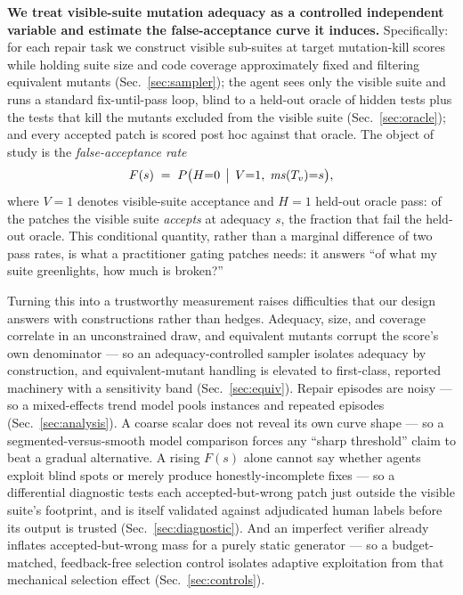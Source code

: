 \documentclass[conference]{IEEEtran}
\newcommand{\ms}{\ensuremath{\mathit{ms}}}
\newcommand{\Fs}{\ensuremath{F(s)}}
\begin{document}
\textbf{We treat visible-suite mutation adequacy as a controlled
independent variable and estimate the false-acceptance curve it induces.}
Specifically: for each repair task we construct visible sub-suites at
target mutation-kill scores while holding suite size and code coverage
approximately fixed and filtering equivalent mutants
(Sec.~\ref{sec:sampler}); the agent sees only the visible suite and runs a
standard fix-until-pass loop, blind to a held-out oracle of hidden tests
plus the tests that kill the mutants excluded from the visible suite
(Sec.~\ref{sec:oracle}); and every accepted patch is scored post hoc
against that oracle. The object of study is the \emph{false-acceptance
rate}
\begin{equation}
\Fs \;=\; P\bigl(H{=}0 \,\bigm|\, V{=}1,\; \ms(T_v){=}s\bigr),
\label{eq:fs}
\end{equation}
where $V{=}1$ denotes visible-suite acceptance and $H{=}1$ held-out oracle
pass: of the patches the visible suite \emph{accepts} at adequacy $s$, the
fraction that fail the held-out oracle. This conditional quantity, rather
than a marginal difference of two pass rates, is what a practitioner
gating patches needs: it answers ``of what my suite greenlights, how much
is broken?''

Turning this into a trustworthy measurement raises difficulties that our
design answers with constructions rather than hedges. Adequacy, size, and
coverage correlate in an unconstrained draw, and equivalent mutants
corrupt the score's own denominator --- so an adequacy-controlled sampler
isolates adequacy by construction, and equivalent-mutant handling is
elevated to first-class, reported machinery with a sensitivity band
(Sec.~\ref{sec:equiv}). Repair episodes are noisy --- so a mixed-effects
trend model pools instances and repeated episodes
(Sec.~\ref{sec:analysis}). A coarse scalar does not reveal its own curve
shape --- so a segmented-versus-smooth model comparison forces any ``sharp
threshold'' claim to beat a gradual alternative. A rising \Fs{} alone
cannot say whether agents exploit blind spots or merely produce
honestly-incomplete fixes --- so a differential diagnostic tests each
accepted-but-wrong patch just outside the visible suite's footprint, and
is itself validated against adjudicated human labels before its output is
trusted (Sec.~\ref{sec:diagnostic}). And an imperfect verifier already
inflates accepted-but-wrong mass for a purely static generator --- so a
budget-matched, feedback-free selection control isolates adaptive
exploitation from that mechanical selection effect
(Sec.~\ref{sec:controls}).
\end{document}
